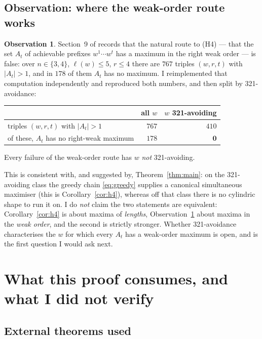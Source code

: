 \documentclass[11pt]{article}
\theoremstyle{plain}
\theoremstyle{definition}
\newtheorem{obs}[thm]{Observation}
\begin{document}
\subsection{Observation: where the weak-order route works}

\begin{obs}\label{obs:q212}
Section~9 of \cite{Clio2026b} records that the natural route to (H4) --- that the set $A_t$ of
achievable prefixes $w^1\cdots w^t$ has a maximum in the right weak order --- is false: over
$n\in\{3,4\}$, $\ell(w)\le5$, $r\le4$ there are $767$ triples $(w,r,t)$ with $|A_t|>1$, and in
$178$ of them $A_t$ has no maximum. I reimplemented that computation independently and
reproduced both numbers, and then split by 321-avoidance:
\begin{center}
\begin{tabular}{lrr}
\hline
 & all $w$ & $w$ 321-avoiding \\
\hline
triples $(w,r,t)$ with $|A_t|>1$ & $767$ & $410$ \\
of these, $A_t$ has no right-weak maximum & $178$ & $\mathbf{0}$ \\
\hline
\end{tabular}
\end{center}
Every failure of the weak-order route has $w$ \emph{not} 321-avoiding.
\end{obs}

This is consistent with, and suggested by, Theorem~\ref{thm:main}: on the 321-avoiding class
the greedy chain \eqref{eq:greedy} supplies a canonical simultaneous maximiser (this is
Corollary~\ref{cor:h4}), whereas off that class there is no cylindric shape to run it on. I
do \emph{not} claim the two statements are equivalent: Corollary~\ref{cor:h4} is about maxima
of \emph{lengths}, Observation~\ref{obs:q212} about maxima in the \emph{weak order}, and the
second is strictly stronger. Whether 321-avoidance characterises the $w$ for which every $A_t$
has a weak-order maximum is open, and is the first question I would ask next.

\section{What this proof consumes, and what I did not verify}\label{sec:consumes}

\subsection{External theorems used}
\end{document}
